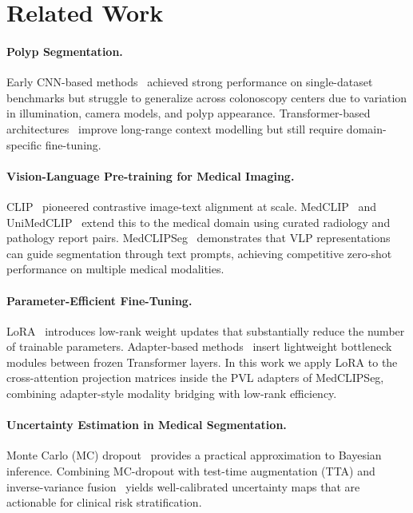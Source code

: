 
\section{Related Work}
\label{sec:related}

\paragraph{Polyp Segmentation.}
Early CNN-based methods~\cite{fan2020pranet,wei2021shallow} achieved strong
performance on single-dataset benchmarks but struggle to generalize across
colonoscopy centers due to variation in illumination, camera models, and polyp
appearance. Transformer-based architectures~\cite{zhang2021transfuse,dong2021polyp}
improve long-range context modelling but still require domain-specific fine-tuning.

\paragraph{Vision-Language Pre-training for Medical Imaging.}
CLIP~\cite{radford2021clip} pioneered contrastive image-text alignment at scale.
MedCLIP~\cite{wang2022medclip} and UniMedCLIP~\cite{} extend this to the medical
domain using curated radiology and pathology report pairs. MedCLIPSeg~\cite{}
demonstrates that VLP representations can guide segmentation through text prompts,
achieving competitive zero-shot performance on multiple medical modalities.

\paragraph{Parameter-Efficient Fine-Tuning.}
LoRA~\cite{hu2022lora} introduces low-rank weight updates that substantially reduce
the number of trainable parameters. Adapter-based methods~\cite{houlsby2019adapter}
insert lightweight bottleneck modules between frozen Transformer layers.
In this work we apply LoRA to the cross-attention projection matrices inside the
PVL adapters of MedCLIPSeg, combining adapter-style modality bridging with
low-rank efficiency.

\paragraph{Uncertainty Estimation in Medical Segmentation.}
Monte Carlo (MC) dropout~\cite{gal2016dropout} provides a practical approximation
to Bayesian inference. Combining MC-dropout with test-time augmentation (TTA) and
inverse-variance fusion~\cite{wang2019aleatoric} yields well-calibrated uncertainty
maps that are actionable for clinical risk stratification.

